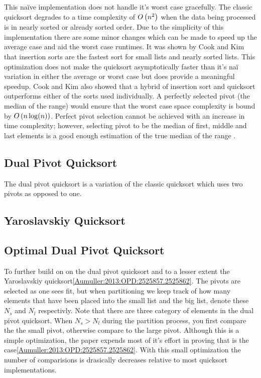        This na\"{i}ve implementation does not handle it's worst case gracefully. The classic quicksort degrades to a time complexity of $O\left(n^2\right)$ when the data being processed is in nearly sorted or already sorted order. Due to the simplicity of this implementation there are some minor changes which can be made to speed up the average case and aid the worst case runtimes. It was shown by Cook and Kim \cite{cook1980best} that insertion sorts are the fastest sort for small lists and nearly sorted lists. This optimization does not make the quicksort asymptotically faster than it's na\"{i} variation in either the average or worst case but does provide a meaningful speedup. Cook and Kim also showed that a hybrid of insertion sort and quicksort outperforms either of the sorts used individually. A perfectly selected pivot (the median of the range) would ensure that the worst case space complexity is bound by $O\left(n\log(n)\right)$. Perfect pivot selection cannot be achieved with an increase in time complexity; however, selecting pivot to be the median of first, middle and last elements is a good enough estimation of the true median of the range \cite{sedgewick1978implementing}.


	\subsection{Dual Pivot Quicksort}
		\label{subsec:DualPivotQSortIntro}

        The dual pivot quicksort is a variation of the classic quicksort which uses two pivots as opposed to one. 
	
	\subsection{Yaroslavskiy Quicksort}    
        \label{subsec:YaroslavskiyQSortIntro}
		
		
    \subsection{Optimal Dual Pivot Quicksort}	
		\label{subsec:OptimalDualPivotQSortIntro}
		To further build on on the dual pivot quicksort and to a lesser extent the Yaroslavskiy quicksort\ref{Aumuller:2013:OPD:2525857.2525862}. The pivots are selected as one sees fit, but when partitioning we keep track of how many elements that have been placed into the small list and the big list, denote these $N_s$ and $N_l$ respectivly. Note that there are three category of elements in the dual pivot quicksort. When $N_s > N_l$ during the partition process, you first compare the the small pivot, otherwise compare to the large pivot. Although this is a simple optimization, the paper expends most of it's effort in proving that is the case\ref{Aumuller:2013:OPD:2525857.2525862}. With this small optimization the number of comparisions is drasically decreases relative to most quicksort implementations.
		
